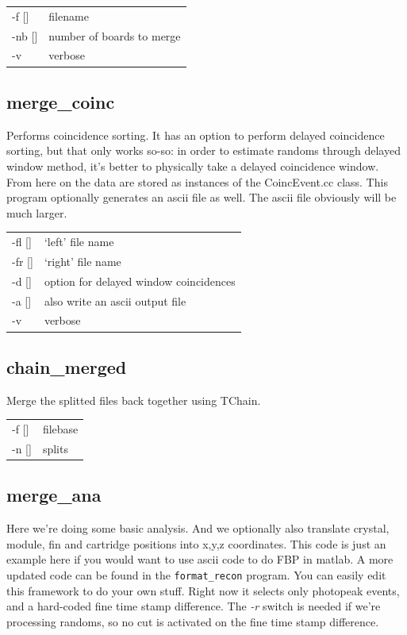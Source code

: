 \documentclass[12pt]{article}
\begin{document}
\begin{tabular}{ll}
-f []&filename\\
-nb [] & number of boards to merge\\
-v & verbose\\
\end{tabular}


\subsection{merge\_coinc}
Performs coincidence sorting. It has an option to perform delayed coincidence sorting, but that only works so-so: in order to estimate randoms through delayed window method, it's better to physically take a delayed coincidence window. From here on the data are stored as instances of the CoincEvent.cc class. This program optionally generates an ascii file as well. The ascii file obviously will be much larger.\\

\begin{tabular}{ll}
-fl [] & `left' file name\\
-fr [] & `right' file name\\
-d [] & option for delayed window coincidences\\
-a [] & also write an ascii output file\\
-v & verbose\\
\end{tabular}

\subsection{chain\_merged}
Merge the splitted files back together using TChain.\\

\begin{tabular}{ll}
-f [] & filebase\\
-n [] & splits\\
\end{tabular}

\subsection{merge\_ana}
Here we're doing some basic analysis. And we optionally also translate crystal, module, fin and cartridge positions into x,y,z coordinates. This code is just an example here if you would want to use ascii code to do FBP in matlab. A more updated code can be found in the {\tt format\_recon} program. You can easily edit this framework to do your own stuff. Right now it selects only photopeak events, and a hard-coded fine time stamp difference. The {\em -r} switch is needed if we're processing randoms, so no cut is activated on the fine time stamp difference. \\
\end{document}
